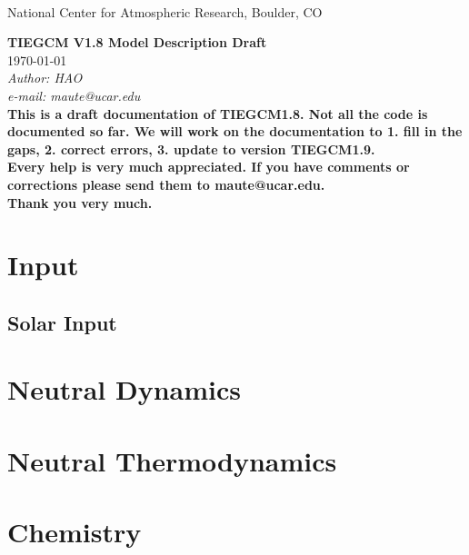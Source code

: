 \documentclass[12pt]{book}
\begin{document}
%
\begin{titlepage}
%
 \\
\noindent National Center for Atmospheric Research, Boulder, CO \\
\vspace{2in}
%
\begin{center}
{\Large\bf TIEGCM V1.8 Model Description Draft} \\
{\today} \\
\medskip
{\it Author: HAO} \\
{\it e-mail: maute@ucar.edu\\}
\medskip
\medskip
{\bf This is a draft documentation of TIEGCM1.8. Not all the code is documented so far.
We will work on the documentation to 1. fill in the gaps, 2. correct errors,
3. update to version TIEGCM1.9. \\
Every help is very much appreciated. If you have comments or   corrections
please send them to maute@ucar.edu.\\
Thank you very much.}
\end{center}
%
\end{titlepage}
%
\setcounter{page}{1}
%

%
\tableofcontents
\listoffigures
\listoftables
\printindex
%

%
%
\newpage
%

\chapter{Input}
\section{Solar Input}

\chapter{Neutral Dynamics}


\chapter{Neutral Thermodynamics}


\chapter{Chemistry}





\end{document}
